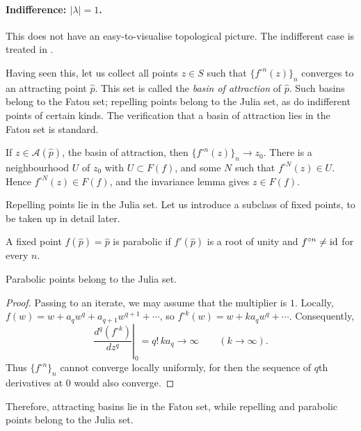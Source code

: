 \documentclass[11pt,a4paper]{article}
\begin{document}
\paragraph{Indifference: $|\lambda|=1$.}
This does not have an easy-to-visualise topological picture. The indifferent case is treated in .

Having seen this, let us collect all points $z\in S$ such that $\{f^{\circ n}(z)\}_n$ converges to an attracting point $\widehat p$. This set is called the \emph{basin of attraction} of $\widehat p$. Such basins belong to the Fatou set; repelling points belong to the Julia set, as do indifferent points of certain kinds. The verification that a basin of attraction lies in the Fatou set is standard.

If $z\in\mathcal A(\widehat p)$, the basin of attraction, then $\{f^{\circ n}(z)\}_n\to z_0$. There is a neighbourhood $U$ of $z_0$ with $U\subset F(f)$, and some $N$ such that $f^{\circ N}(z)\in U$. Hence $f^{\circ N}(z)\in F(f)$, and the invariance lemma gives $z\in F(f)$.

Repelling points lie in the Julia set. Let us introduce a subclass of fixed points, to be taken up in detail later.
\setcounter{definition}{4}\begin{definition}
A fixed point $f(\widehat p)=\widehat p$ is parabolic if $f'(\widehat p)$ is a root of unity and $f^{\circ n}\ne\operatorname{id}$ for every $n$.
\end{definition}
\setcounter{theorem}{4}\begin{lemma}\label{cd1:parabolic}
Parabolic points belong to the Julia set.
\end{lemma}
\begin{proof}
Passing to an iterate, we may assume that the multiplier is $1$.
Locally, $f(w)=w+a_qw^q+a_{q+1}w^{q+1}+\cdots$, so $f^{\circ k}(w)=w+ka_qw^q+\cdots$. Consequently,
\[
\left.\frac{d^q(f^{\circ k})}{dz^q}\right|_0=q!\,ka_q\longrightarrow\infty
\qquad(k\to\infty).
\]
Thus $\{f^{\circ n}\}_n$ cannot converge locally uniformly, for then the sequence of $q$th derivatives at $0$ would also converge.
\end{proof}
Therefore, attracting basins lie in the Fatou set, while repelling and parabolic points belong to the Julia set.
\end{document}
